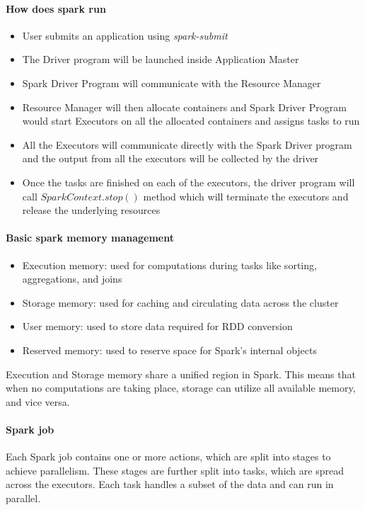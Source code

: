 \paragraph{How does spark run}
\begin{itemize}
    \item User submits an application using \textit{spark-submit}
    \item The Driver program will be launched inside Application Master
    \item Spark Driver Program will communicate with the Resource Manager
    \item Resource Manager will then allocate containers and Spark Driver Program would start Executors on all the allocated containers and assigns tasks to run
    \item All the Executors will communicate directly with the Spark Driver program and the output from all the executors will be collected by the driver
    \item Once the tasks are finished on each of the executors, the driver program will call $SparkContext.stop()$ method which will terminate the executors and release the underlying resources
\end{itemize}

\paragraph{Basic spark memory management}
\begin{itemize}
    \item Execution memory: used for computations during tasks like sorting, aggregations, and joins
    \item Storage memory: used for caching and circulating data across the cluster
    \item User memory: used to store data required for RDD conversion
    \item Reserved memory: used to reserve space for Spark's internal objects
\end{itemize}
Execution and Storage memory share a unified region in Spark. This means that when no computations are taking place, storage can utilize all available memory, and vice versa.

\paragraph{Spark job}
Each Spark job contains one or more actions, which are split into stages to achieve parallelism. These stages are further split into tasks, which are spread across the executors. Each task handles a subset of the data and can run in parallel.


